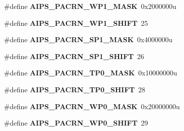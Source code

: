 \begin{DoxyCompactItemize}
\item 
\hypertarget{group___a_i_p_s___register___masks_gacb6bc84650cdad0c9becba836de9cf45}{}\#define {\bfseries A\+I\+P\+S\+\_\+\+P\+A\+C\+R\+N\+\_\+\+W\+P1\+\_\+\+M\+A\+S\+K}~0x2000000u\label{group___a_i_p_s___register___masks_gacb6bc84650cdad0c9becba836de9cf45}

\item 
\hypertarget{group___a_i_p_s___register___masks_gac732c81bbc1619d8d0da6895ab7866f4}{}\#define {\bfseries A\+I\+P\+S\+\_\+\+P\+A\+C\+R\+N\+\_\+\+W\+P1\+\_\+\+S\+H\+I\+F\+T}~25\label{group___a_i_p_s___register___masks_gac732c81bbc1619d8d0da6895ab7866f4}

\item 
\hypertarget{group___a_i_p_s___register___masks_gae9c06e20322a0251ebd7bbf695918655}{}\#define {\bfseries A\+I\+P\+S\+\_\+\+P\+A\+C\+R\+N\+\_\+\+S\+P1\+\_\+\+M\+A\+S\+K}~0x4000000u\label{group___a_i_p_s___register___masks_gae9c06e20322a0251ebd7bbf695918655}

\item 
\hypertarget{group___a_i_p_s___register___masks_ga85a1c85ee827d9dda3387b3c49c494a8}{}\#define {\bfseries A\+I\+P\+S\+\_\+\+P\+A\+C\+R\+N\+\_\+\+S\+P1\+\_\+\+S\+H\+I\+F\+T}~26\label{group___a_i_p_s___register___masks_ga85a1c85ee827d9dda3387b3c49c494a8}

\item 
\hypertarget{group___a_i_p_s___register___masks_gafa65d16a8ef57d9863108502ee7ec35e}{}\#define {\bfseries A\+I\+P\+S\+\_\+\+P\+A\+C\+R\+N\+\_\+\+T\+P0\+\_\+\+M\+A\+S\+K}~0x10000000u\label{group___a_i_p_s___register___masks_gafa65d16a8ef57d9863108502ee7ec35e}

\item 
\hypertarget{group___a_i_p_s___register___masks_gaca5165b8816e465b136db3c0cec9c8dd}{}\#define {\bfseries A\+I\+P\+S\+\_\+\+P\+A\+C\+R\+N\+\_\+\+T\+P0\+\_\+\+S\+H\+I\+F\+T}~28\label{group___a_i_p_s___register___masks_gaca5165b8816e465b136db3c0cec9c8dd}

\item 
\hypertarget{group___a_i_p_s___register___masks_gaf3c361cda4815ea73ef80bfe50d0f30a}{}\#define {\bfseries A\+I\+P\+S\+\_\+\+P\+A\+C\+R\+N\+\_\+\+W\+P0\+\_\+\+M\+A\+S\+K}~0x20000000u\label{group___a_i_p_s___register___masks_gaf3c361cda4815ea73ef80bfe50d0f30a}

\item 
\hypertarget{group___a_i_p_s___register___masks_ga38fa165b25262b49b3be41ab2d5fc5d5}{}\#define {\bfseries A\+I\+P\+S\+\_\+\+P\+A\+C\+R\+N\+\_\+\+W\+P0\+\_\+\+S\+H\+I\+F\+T}~29\label{group___a_i_p_s___register___masks_ga38fa165b25262b49b3be41ab2d5fc5d5}


\end{DoxyCompactItemize}

